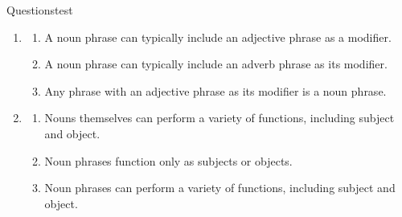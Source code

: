 \begin{tblsframedsymbol}{Questions}{test}
\begin{enumerate}[noitemsep, leftmargin=*]
\begin{enumerate}[noitemsep]
            \item A noun is any word that follows  or .
            \item Nouns can typically follow  or .
            \item Any word that typically follows  or  is a noun.
        \end{enumerate}
        \item\begin{enumerate}[noitemsep]
            \item A noun phrase can typically include an adjective phrase as a modifier.
            \item A noun phrase can typically include an adverb phrase as its modifier.
            \item Any phrase with an adjective phrase as its modifier is a noun phrase.
        \end{enumerate}
        \item\begin{enumerate}[noitemsep]
            \item Nouns themselves can perform a variety of functions, including subject and object.
            \item Noun phrases function only as subjects or objects.
            \item Noun phrases can perform a variety of functions, including subject and object.
        \end{enumerate}
    \end{enumerate}
\end{tblsframedsymbol}



